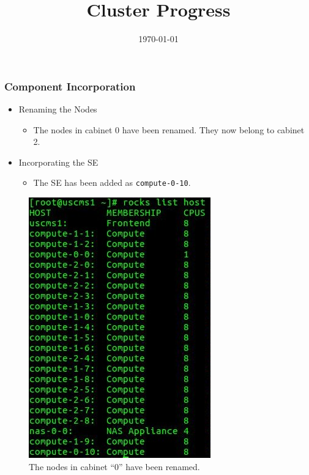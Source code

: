 \documentclass{beamer}
\title{Cluster Progress}
\date{\today}
\begin{document}

\begin{frame}
  \maketitle
\end{frame}



\begin{frame}

  \frametitle{Component Incorporation}
  
  \begin{multicols}{2}

    \begin{itemize}
    \item Renaming the Nodes
      \begin{itemize}
      \item The nodes in cabinet 0 have been renamed. They now belong to cabinet 2.
      \end{itemize}
    \item Incorporating the SE
      \begin{itemize}
      \item The SE has been added as {\tt compute-0-10}.
      \end{itemize}
    \end{itemize}
    
    \columnbreak
    
    \begin{figure}[H]
      \begin{center}
        \includegraphics[scale=0.35]{renamed_nodes.png}
      \end{center}
      \caption{The nodes in cabinet ``0'' have been renamed.}
    \end{figure}
  
  \end{multicols}
  
\end{frame}
\end{document}
